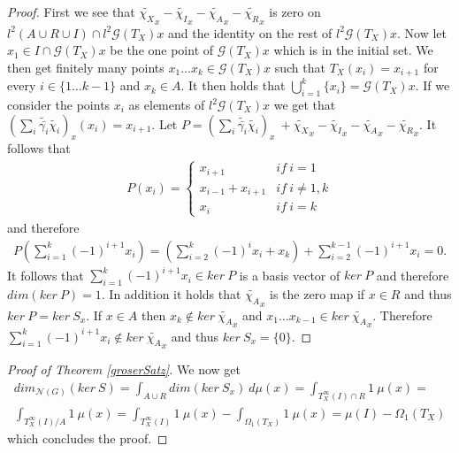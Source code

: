 \documentclass[12pt,a4paper]{scrartcl}
\numberwithin{equation}{section}
\newcommand{\2}{\mathbb{Z} / 2 \mathbb{Z}}
\newcommand{\G}{\mathcal{G}}
\newcommand{\1}{\bar{1}}
\newcommand{\0}{\bar{0}}
\begin{document}
\begin{proof}
	First we see that $\tilde{\chi_X}_x - \tilde{\chi_I}_x - \tilde{\chi_A}_x - \tilde{\chi_R}_x$ is zero on $l^2(A \cup R \cup I) \cap l^2 \G (T_X)x$ and the identity on the rest of $l^2 \G (T_X)x$. Now let $x_1 \in I \cap \G (T_X)x$ be the one point of $\G (T_X)x$ which is in the initial set. We then get finitely many points $x_1 \ldots x_k \in \G (T_X)x$ such that $T_X(x_i) = x_{i + 1}$ for every $i \in \{1 \ldots k - 1\}$ and $x_k \in A$. It then holds that $\bigcup_{i = 1}^{k} \{x_i\} = \G (T_X)x$. If we consider the points $x_i$ as elements of $l^2 \G (T_X)x$ we get that $(\sum_{i} \tilde{\bar{\gamma_i}} \tilde{\chi_i})_x(x_i) =x_{i+1}$. Let $P = (\sum_{i} \tilde{\bar{\gamma_i}} \tilde{\chi_i})_x \ + \tilde{\chi_X}_x - \tilde{\chi_I}_x - \tilde{\chi_A}_x - \tilde{\chi_R}_x$. It follows that
	\begin{align*}
		P(x_i) = \begin{cases}
		x_{i + 1} & if \ i = 1 \\
		x_{i - 1} + x_{i + 1} & if \ i \neq 1, k \\
		x_{i} & if \ i = k
		\end{cases}
	\end{align*}
	and therefore 
	\begin{align*}
		P(\sum_{i = 1}^{k} (-1)^{i + 1} x_i) = (\sum_{i = 2}^{k} (-1)^{i} x_{i} + x_k) + \sum_{i = 2}^{k - 1} (-1)^{i + 1} x_{i} = 0.
	\end{align*}
	It follows that $\sum_{i = 1}^{k} (-1)^{i + 1} x_i \in ker \ P$ is a basis vector of $ ker \ P$ and therefore $dim(ker \ P) = 1$. In addition it holds that $\tilde{\chi_A}_x$ is the zero map if $x \in R$ and thus $ker \ P = ker \ S_x$. If $x \in A$ then $x_k \notin ker \ \tilde{\chi_A}_x$ and $x_1 \ldots x_{k - 1} \in ker \ \tilde{\chi_A}_x$. Therefore $\sum_{i = 1}^{k} (-1)^{i + 1} x_i \notin ker \ \tilde{\chi_A}_x$ and thus $ker \ S_x = \{0\}$.
\end{proof}
\begin{proof}[Proof of Theorem \ref{groserSatz}]
	We now get
	\begin{align*}
		dim_{\mathcal{N}(G)}(ker \ S) = \int_{A \cup R} dim (ker \ S_x) \ d \mu (x) = \int_{T_X^\infty(I) \cap R} 1 \ \mu (x) = \\ \int_{T_X^\infty(I) / A} 1 \ \mu (x) = \int_{T_X^\infty(I)} 1 \ \mu (x) - \int_{\Omega_1(T_X)} 1 \ \mu (x) = \mu(I) - \Omega_1(T_X)
	\end{align*}
	which concludes the proof. 
\end{proof}
\end{document}
